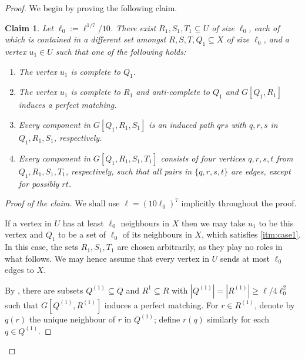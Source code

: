 \documentclass[11pt,english]{article}
\theoremstyle{plain}
\newtheorem{claim}[thm]{Claim}
\theoremstyle{definition}
\theoremstyle{remark}
\begin{document}
    \begin{proof}
        We begin by proving the following claim.
        \begin{claim}
            Let $\ell_0 := \ell^{1/7} / 10$.
            There exist $R_1, S_1, T_1 \subseteq U$ of size $\ell_0$, each of which is contained in a different set amongst $R, S, T, Q_1 \subseteq X$ of size $\ell_0$, and a vertex $u_1 \in U$ such that one of the following holds:
            \begin{enumerate}[label = \rm(\alph*)]
                \item \label{itm:case1}
                     The vertex $u_1$ is complete to $Q_1$.
                \item \label{itm:case2}
                     The vertex $u_1$ is complete to $R_1$ and anti-complete to $Q_1$ and $G[Q_1, R_1]$ induces a perfect matching.
                \item \label{itm:case3}
                    Every component in $G[Q_1, R_1, S_1]$ is an induced path $qrs$ with $q, r, s$ in $Q_1, R_1, S_1$, respectively.
                \item \label{itm:case4}
                    Every component in $G[Q_1, R_1, S_1, T_1]$ consists of four vertices $q, r, s, t$ from $Q_1, R_1, S_1, T_1$, respectively, such that all pairs in $\{q, r, s, t\}$ are edges, except for possibly $rt$.
            \end{enumerate}
        \end{claim}
        
        \def \nq{q}
        \def \nr{r}
        \def \ns{s}
        \def \nt{t}
             
        \begin{proof}[Proof of the claim]
            We shall use $\ell = (10\ell_0)^7$  implicitly throughout the proof.
            
            If a vertex in $U$ has at least $\ell_0$ neighbours in $X$ then we may take $u_1$ to be this vertex and $Q_1$ to be a set of $\ell_0$ of its neighbours in $X$, which satisfies \ref{itm:case1}.
            In this case, the sets $R_1, S_1, T_1$ are chosen arbitrarily, as they play no roles in what follows. We may hence assume that every vertex in $U$ sends at most $\ell_0$ edges to $X$.
            
            By , there are subsets $Q^{(1)} \subseteq Q$ and $R^1 \subseteq R$ with $|Q^{(1)}| = |R^{(1)}| \ge \ell / 4\ell_0^2$ such that $G[Q^{(1)}, R^{(1)}]$ induces a perfect matching. 
            For $r \in R^{(1)}$, denote by $\nq(r)$ the unique neighbour of $r$ in $Q^{(1)}$; define $\nr(q)$ similarly for each $q \in Q^{(1)}$.
            

\end{proof}
\end{proof}
\end{document}
